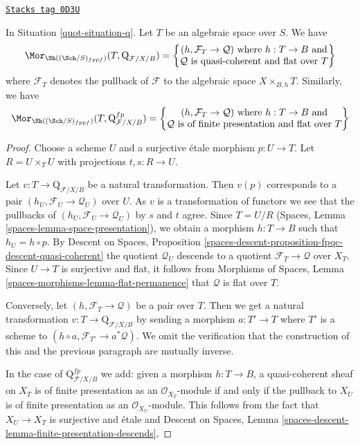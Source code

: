 \begin{lemma}
\label{quot-lemma-extend-q-to-spaces}
\href{https://stacks.math.columbia.edu/tag/0D3U}{\texttt{Stacks tag 0D3U}}

In Situation \ref{quot-situation-q}. Let $T$ be an algebraic space over $S$.
We have
$$
\Mor_{\Sh((\Sch/S)_{fppf})}(T,  \text{Q}_{\mathcal{F}/X/B}) =
\left\{
\begin{matrix}
(h, \mathcal{F}_T \to \mathcal{Q}) \text{ where }
h : T \to B \text{ and}\\
\mathcal{Q}\text{ is quasi-coherent and flat over }T
\end{matrix}
\right\}
$$
where $\mathcal{F}_T$ denotes the pullback of $\mathcal{F}$
to the algebraic space $X \times_{B, h} T$. Similarly, we have
$$
\Mor_{\Sh((\Sch/S)_{fppf})}(T,  \text{Q}^{fp}_{\mathcal{F}/X/B}) =
\left\{
\begin{matrix}
(h, \mathcal{F}_T \to \mathcal{Q}) \text{ where }
h : T \to B \text{ and}\\
\mathcal{Q}\text{ is of finite presentation and flat over }T
\end{matrix}
\right\}
$$
\end{lemma}

\begin{proof}
Choose a scheme $U$ and a surjective \'etale morphism $p : U \to T$.
Let $R = U \times_T U$ with projections $t, s : R \to U$.

\medskip\noindent
Let $v : T \to \text{Q}_{\mathcal{F}/X/B}$
be a natural transformation. Then $v(p)$ corresponds to a pair
$(h_U, \mathcal{F}_U \to \mathcal{Q}_U)$ over $U$.
As $v$ is a transformation of functors we see
that the pullbacks of $(h_U, \mathcal{F}_U \to \mathcal{Q}_U)$
by $s$ and $t$ agree.
Since $T = U/R$ (Spaces, Lemma \ref{spaces-lemma-space-presentation}),
we obtain a morphism $h : T \to B$ such that
$h_U = h \circ p$. By Descent on Spaces, Proposition
\ref{spaces-descent-proposition-fpqc-descent-quasi-coherent}
the quotient $\mathcal{Q}_U$ descends to a quotient
$\mathcal{F}_T \to \mathcal{Q}$ over $X_T$.
Since $U \to T$ is surjective and flat, it follows from
Morphisms of Spaces, Lemma \ref{spaces-morphisms-lemma-flat-permanence}
that $\mathcal{Q}$ is flat over $T$.

\medskip\noindent
Conversely, let $(h, \mathcal{F}_T \to \mathcal{Q})$ be a pair over $T$.
Then we get a natural transformation
$v : T \to \text{Q}_{\mathcal{F}/X/B}$
by sending a morphism $a : T' \to T$ where $T'$ is a scheme
to $(h \circ a, \mathcal{F}_{T'} \to a^*\mathcal{Q})$.
We omit the verification that the construction
of this and the previous paragraph are mutually inverse.

\medskip\noindent
In the case of $\text{Q}^{fp}_{\mathcal{F}/X/B}$ we
add: given a morphism $h : T \to B$, a quasi-coherent sheaf
on $X_T$ is of finite presentation as an $\mathcal{O}_{X_T}$-module
if and only if the pullback to $X_U$ is of finite presentation as an
$\mathcal{O}_{X_U}$-module. This follows from the fact that
$X_U \to X_T$ is surjective and \'etale and
Descent on Spaces, Lemma
\ref{spaces-descent-lemma-finite-presentation-descends}.
\end{proof}

